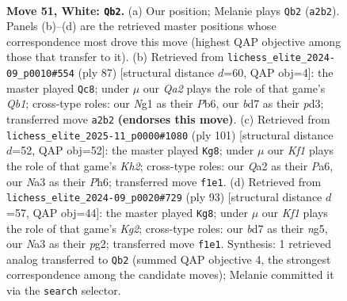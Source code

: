 \documentclass[11pt]{article}
\begin{document}
\clearpage

\begin{figure}[p]\centering
\begin{subfigure}{0.46\textwidth}\centering
\resizebox{\linewidth}{!}{%
\newchessgame
\chessboard[
  setfen={4n3/3b2k1/p7/3PPp1p/6p1/N7/Q4P2/5KNq w - - 5 51},
  showmover=false,
  pgfstyle=straightmove, color=movearrow, markmove={a2-b2}
]}
\caption{}
\end{subfigure}\hfill
\begin{subfigure}{0.46\textwidth}\centering
\resizebox{\linewidth}{!}{%
\newchessgame
\chessboard[
  setfen={1q4k1/5p2/1p4p1/8/1Q3PP1/3P3p/4P2P/5K2 b - - 0 44},
  showmover=false,
  pgfstyle=straightmove, color=movearrow, markmove={b8-c8}
]}
\caption{}
\end{subfigure}
\\[4pt]
\begin{subfigure}{0.46\textwidth}\centering
\resizebox{\linewidth}{!}{%
\newchessgame
\chessboard[
  setfen={8/1p4pk/pP5p/P7/3Pq3/3n1N2/2Q3P1/7K b - - 17 51},
  showmover=false,
  pgfstyle=straightmove, color=movearrow, markmove={h7-g8}
]}
\caption{}
\end{subfigure}\hfill
\begin{subfigure}{0.46\textwidth}\centering
\resizebox{\linewidth}{!}{%
\newchessgame
\chessboard[
  setfen={8/3q2k1/1p4p1/1P1nPpN1/3Q4/8/6PK/8 b - - 3 47},
  showmover=false,
  pgfstyle=straightmove, color=movearrow, markmove={g7-g8}
]}
\caption{}
\end{subfigure}
\caption{\textbf{Move 51, White: \texttt{Qb2}.} (a) Our position; Melanie plays \texttt{Qb2} (\texttt{a2b2}). Panels (b)--(d) are the retrieved master positions whose correspondence most drove this move (highest QAP objective among those that transfer to it). (b) Retrieved from \texttt{lichess\_elite\_2024-09\_p0010\#554} (ply 87) [structural distance $d$=60, QAP obj=4]: the master played \texttt{Qc8}; under $\mu$ our \emph{Qa2} plays the role of that game's \emph{Qb1}; cross-type roles: our \emph{N}g1 as their \emph{P}b6, our \emph{b}d7 as their \emph{p}d3; transferred move \texttt{a2b2} \textbf{(endorses this move)}. (c) Retrieved from \texttt{lichess\_elite\_2025-11\_p0000\#1080} (ply 101) [structural distance $d$=52, QAP obj=52]: the master played \texttt{Kg8}; under $\mu$ our \emph{Kf1} plays the role of that game's \emph{Kh2}; cross-type roles: our \emph{Q}a2 as their \emph{P}a6, our \emph{N}a3 as their \emph{P}h6; transferred move \texttt{f1e1}. (d) Retrieved from \texttt{lichess\_elite\_2024-09\_p0020\#729} (ply 93) [structural distance $d$=57, QAP obj=44]: the master played \texttt{Kg8}; under $\mu$ our \emph{Kf1} plays the role of that game's \emph{Kg2}; cross-type roles: our \emph{b}d7 as their \emph{n}g5, our \emph{N}a3 as their \emph{p}g2; transferred move \texttt{f1e1}. Synthesis: 1 retrieved analog transferred to \texttt{Qb2} (summed QAP objective 4, the strongest correspondence among the candidate moves); Melanie committed it via the \texttt{search} selector.}
\label{fig:thought-m100}
\end{figure}
\end{document}

